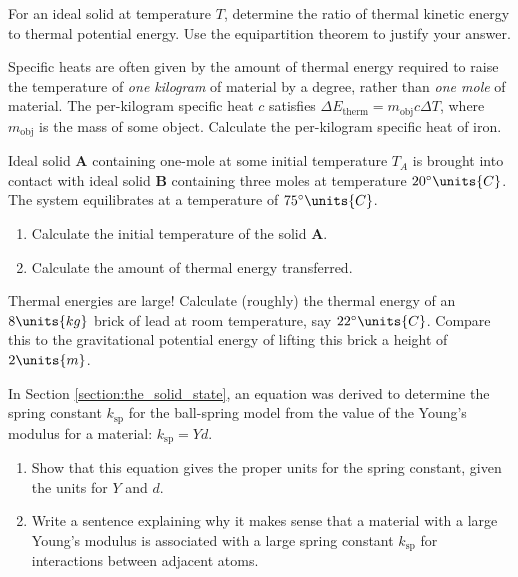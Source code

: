 \begin{problem}
  For an ideal solid at temperature $T$, determine the ratio of
  thermal kinetic energy to thermal potential energy.  Use the
  equipartition theorem to justify your answer.
\end{problem}


\begin{problem}
Specific heats are often given by the amount of thermal energy
required to raise the temperature of {\it one kilogram} of material by
a degree, rather than {\it one mole} of material.  The per-kilogram
specific heat $c$ satisfies $\Delta E_\text{therm} = m_\text{obj} c
\Delta T$, where $m_\text{obj}$ is the mass of some object. Calculate
the per-kilogram specific heat of iron.
\end{problem}


\begin{problem}
  Ideal solid {\bf A} containing one-mole at some initial temperature $T_A$ is
  brought into contact with ideal solid {\bf B} containing three moles at
  temperature $20^\circ\units{C}$.  The system equilibrates at a
  temperature of $75^\circ\units{C}$.
\begin{enumerate}
\item Calculate the initial temperature of the solid {\bf A}.
\item Calculate the amount of thermal energy transferred.
\end{enumerate}
\end{problem}


\begin{problem}
Thermal energies are large!  Calculate (roughly) the thermal energy of an
$8\units{kg}$ brick of lead at room temperature, say
$22^\circ\units{C}$.  Compare this to the gravitational potential
energy of lifting this brick a height of $2\units{m}$.
\label{problem:thermal_energies_large}
\end{problem}

\begin{problem}
In Section \ref{section:the_solid_state}, an equation was derived to
determine the spring constant $k_\text{sp}$ for the ball-spring model from
the value of the Young's modulus for a material:  $k_\text{sp} = Yd$.
\begin{enumerate}
\item Show that this equation gives the proper units for the spring
constant, given the units for $Y$ and $d$.
\item Write a sentence explaining why it makes sense that a material
with a large Young's modulus is associated with a large spring constant
$k_\text{sp}$ for interactions between adjacent atoms.
\end{enumerate}
\end{problem}

